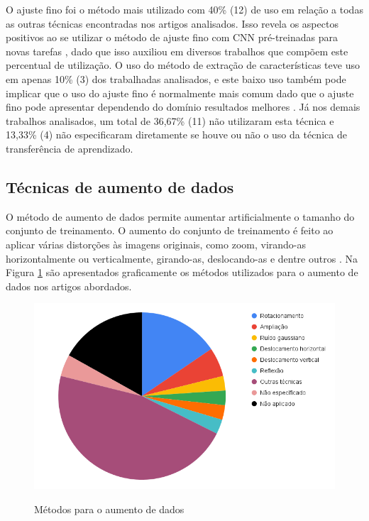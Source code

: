 \documentclass[
	12pt,				%
	oneside,			%
	a4paper,			%
	english,			%
	brazil				%
	]{abntex2ppgsi}
\begin{document}
O ajuste fino foi o método mais utilizado com 40\% (12) de uso em relação a todas as outras técnicas encontradas nos artigos analisados. Isso revela os aspectos positivos ao se utilizar o método de ajuste fino com CNN pré-treinadas para novas tarefas \cite{li2017learning}, dado que isso auxiliou em diversos trabalhos que compõem este percentual de utilização. O uso do método de extração de características teve uso em apenas 10\% (3) dos trabalhadas analisados, e este baixo uso também pode implicar que o uso do ajuste fino é normalmente mais comum dado que o ajuste fino pode apresentar dependendo do domínio resultados melhores \cite{li2017learning}. Já nos demais trabalhos analisados, um total de 36,67\% (11) não utilizaram esta técnica e 13,33\% (4) não especificaram diretamente se houve ou não o uso da técnica de transferência de aprendizado.

\subsection{Técnicas de aumento de dados}
O método de aumento de dados permite aumentar artificialmente o tamanho do conjunto de treinamento. O aumento do conjunto de treinamento é feito ao aplicar várias distorções às imagens originais, como zoom, virando-as horizontalmente ou verticalmente, girando-as, deslocando-as e dentre outros \cite{gomez2019coral}. Na Figura \ref{fig:grafico_aumento-dados_vs_uso} são apresentados graficamente os métodos utilizados para o aumento de dados nos artigos abordados.

\begin{figure}[H]
    \centering
    \caption{Métodos para o aumento de dados}
    \includegraphics[width=1.0\textwidth]{imagens/revisao_sistematica/grafico_aumento_dados_vs_uso.png}
    \label{fig:grafico_aumento-dados_vs_uso}
\end{figure}
\end{document}
